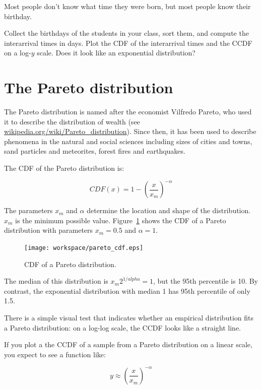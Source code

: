 \documentclass[12pt]{book}
\begin{document}
\begin{ex}

Most people don't know what time they were born, but most people know
their birthday.

Collect the birthdays of the students in your class, sort them, and
compute the interarrival times in days.  Plot the CDF of the interarrival
times and the CCDF on a log-$y$ scale.  Does it look like
an exponential distribution?

\end{ex}


\section{The Pareto distribution}

The Pareto distribution is named after the economist Vilfredo Pareto,
who used it to describe the distribution of wealth (see
\url{wikipedia.org/wiki/Pareto_distribution}).  Since then, it has
been used to describe phenomena in the natural and social
sciences including sizes of cities and towns, sand particles and
meteorites, forest fires and earthquakes.

The CDF of the Pareto distribution is:

\[ CDF(x) = 1- \left( \frac{x}{x_m} \right) ^{-\alpha} \]

The parameters $x_m$ and $\alpha$ determine the location and shape of
the distribution.  $x_m$ is the minimum possible value.
Figure~\ref{pareto_cdf} shows the CDF of a Pareto distribution with
parameters $x_m = 0.5$ and $\alpha = 1$.

\begin{figure}
\centerline{\texttt{[image: workspace/pareto\_cdf.eps]}}
\caption{CDF of a Pareto distribution.}
\label{pareto_cdf}
\end{figure}

The median of this distribution is $x_m 2^{1/alpha} = 1$, but the
95th percentile is 10.  By contrast, the exponential distribution
with median 1 has 95th percentile of only 1.5.

There is a simple visual test that indicates whether an empirical
distribution fits a Pareto distribution: on a log-log scale, the CCDF
looks like a straight line.

If you plot a the CCDF of a sample from a Pareto distribution on a
linear scale, you expect to see a function like:

\[ y \approx \left( \frac{x}{x_m} \right) ^{-\alpha} \]
\end{document}
